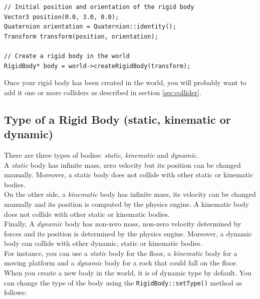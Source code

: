 \documentclass[a4paper,12pt]{article}
\begin{document}
    \begin{lstlisting}
// Initial position and orientation of the rigid body
Vector3 position(0.0, 3.0, 0.0);
Quaternion orientation = Quaternion::identity();
Transform transform(position, orientation);

// Create a rigid body in the world
RigidBody* body = world->createRigidBody(transform);
    \end{lstlisting}

    \vspace{0.6cm}

    Once your rigid body has been created in the world, you will probably want to add it one or more colliders as described in section \ref{sec:collider}.

    \subsection{Type of a Rigid Body (static, kinematic or dynamic)}

    There are three types of bodies: \emph{static}, \emph{kinematic} and \emph{dynamic}. \\
    
    A \emph{static} body has infinite mass, zero velocity but
    its position can be changed manually. Moreover, a static body does not collide with other static or kinematic bodies. \\
    
    On the other side, a \emph{kinematic} body has infinite mass, its velocity can be changed manually and its position is computed by the physics engine.
    A kinematic body does not collide with other static or kinematic bodies. \\
    
    Finally, A \emph{dynamic} body has non-zero mass, non-zero velocity determined
    by forces and its position is determined by the physics engine. Moreover, a dynamic body can collide with other dynamic, static or
    kinematic bodies. \\

    For instance, you can use a \emph{static} body for the floor, a \emph{kinematic} body for a moving platform and a \emph{dynamic} body for a
    rock that could fall on the floor. \\

    When you create a new body in the world, it is of dynamic type by default. You can change the type of the body using the \texttt{RigidBody::setType()}
    method as follows:\\
\end{document}
